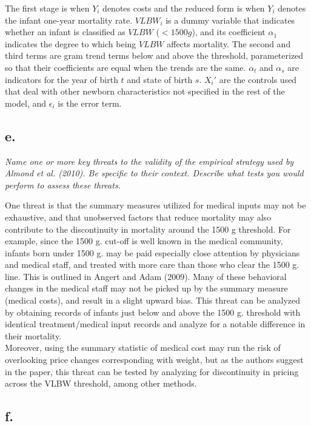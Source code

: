 \documentclass[
]{article}
\begin{document}
The first stage is when \(Y_i\) denotes costs and the reduced form is
when \(Y_i\) denotes the infant one-year mortality rate. \(VLBW_i\) is a
dummy variable that indicates whether an infant is classified as
\(VLBW\) (\(<1500g\)), and its coefficient \(\alpha_1\) indicates the
degree to which being \(VLBW\) affects mortality. The second and third
terms are gram trend terms below and above the threshold, parameterized
so that their coefficients are equal when the trends are the same.
\(\alpha_t\) and \(\alpha_s\) are indicators for the year of birth \(t\)
and state of birth \(s\). \(X_i '\) are the controls used that deal with
other newborn characteristics not specified in the rest of the model,
and \(\epsilon_i\) is the error term.

\hypertarget{e.}{%
\subsection{e.}\label{e.}}

\textit{Name one or more key threats to the validity of the empirical strategy used by Almond et al. (2010). Be specific to their context. Describe what tests you would perform to assess these threats.}

One threat is that the summary measures utilized for medical inputs may
not be exhaustive, and that unobserved factors that reduce mortality may
also contribute to the discontinuity in mortality around the 1500 g
threshold. For example, since the 1500 g. cut-off is well known in the
medical community, infants born under 1500 g. may be paid especially
close attention by physicians and medical staff, and treated with more
care than those who clear the 1500 g. line. This is outlined in Angert
and Adam (2009). Many of these behavioral changes in the medical staff
may not be picked up by the summary measure (medical costs), and result
in a slight upward bias. This threat can be analyzed by obtaining
records of infants just below and above the 1500 g. threshold with
identical treatment/medical input records and analyze for a notable
difference in their mortality.\\
Moreover, using the summary statistic of medical cost may run the risk
of overlooking price changes corresponding with weight, but as the
authors suggest in the paper, this threat can be tested by analyzing for
discontinuity in pricing across the VLBW threshold, among other methods.

\hypertarget{f.}{%
\subsection{f.~}\label{f.}}
\end{document}
